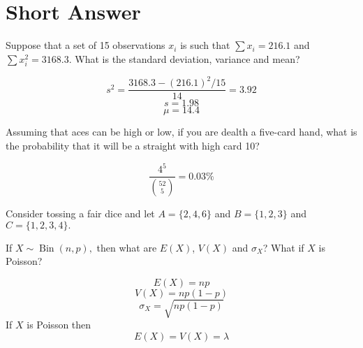 \section{Short Answer}
\begin{questions}
    \question[2] Suppose that a set of 15 observations $x_i$ is such
    that $\sum x_i = 216.1$ and $\sum x_i^2 = 3168.3$. What is the
    standard deviation, variance and mean?
    \begin{solution}
        $$s^2 = \frac{3168.3 - (216.1)^2/15}{14} = 3.92$$
        $$s = 1.98$$
        $$\mu = 14.4$$
    \end{solution}


    \question[3] Assuming that aces can be high or low, if you are
    dealth a five-card hand, what is the probability that it will be a
    straight with high card 10?
    \begin{solution}
        $$\frac{4^5}{ {52 \choose 5} } = 0.03 \%$$
    \end{solution}


    \question[4] Consider tossing a fair dice and let $A = \{2, 4,
    6\}$ and $B = \{1, 2, 3\}$ and $C = \{1, 2, 3, 4\}.$ 

    \question[2] If $X \sim \operatorname{Bin}(n, p),$ then what are
    $E(X)$, $V(X)$ and $\sigma_X$? What if $X$ is Poisson?
    \begin{solution}
        $$E(X) = np$$
        $$V(X) = np(1-p)$$
        $$\sigma_X = \sqrt{np(1-p)}$$
        If $X$ is Poisson then
        $$E(X) = V(X) = \lambda$$
    \end{solution}


\end{questions}
